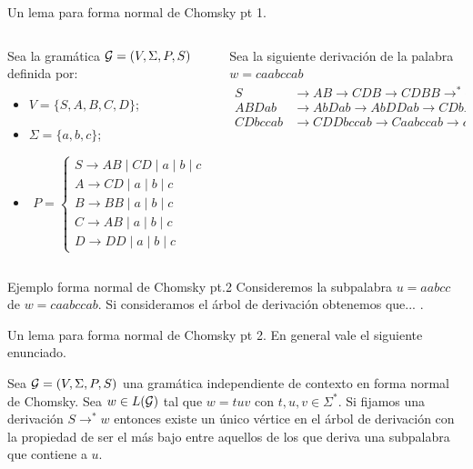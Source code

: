 \documentclass[aspectratio=169, 11pt]{beamer}
\begin{document}
	\begin{frame}[fragile]{Un lema para forma normal de Chomsky pt 1.}
		
		\begin{columns}
			
			\begin{column}{0.5\textwidth}
				Sea la gramática ${\cal G} = (V, \Sigma, P, S)$ definida por:
				\begin{itemize}
					\item $V = \{ S,A,B,C,D \}$;
					\item $\Sigma = \{ a,b,c \}$;
					\item 
						\[
						P = \begin{cases}
								S \to AB \mid CD \mid a \mid b \mid c \\
								A \to CD \mid a \mid b \mid c	\\
								B \to BB \mid a \mid b \mid c	\\
								C \to AB \mid a \mid b \mid c	\\
								D \to DD \mid a \mid b \mid c
						\end{cases}	
						\]
				\end{itemize}
			\end{column}

			\begin{column}{0.5 \textwidth}
				Sea la siguiente derivación de la palabra $w = caabccab$
				\begin{align*}
					S &\to AB \to CDB \to CDBB \to^{*} CDab \to \\
					ABDab & \to  AbDab   \to AbDDab  \to CDbDDab   \to\\
					CDbccab & \to CDDbccab \to Caabccab \to caabccab \\
				\end{align*}
			\end{column}
		\end{columns}
	\end{frame}

	
	\begin{frame}{Ejemplo forma normal de Chomsky pt.2}
		Consideremos la subpalabra $u  = aabcc$ de $w = caabccab$.
		Si consideramos el árbol de derivación obtenemos que... 
		. 
		
	\end{frame}

	\begin{frame}[fragile]{Un lema para forma normal de Chomsky pt 2.}
		En general vale el siguiente enunciado.

		\begin{lemma}
			Sea ${\cal G} = (V, \Sigma, P, S)$ una gramática independiente de contexto en forma normal de Chomsky.
			Sea $w \in L({\cal G})$ tal que $w = tuv$ con $t,u,v \in \Sigma^{*}$. 
			Si fijamos una derivación $S \to^{*} w$ entonces existe un único vértice en el árbol de derivación con la propiedad de ser el más bajo entre aquellos de los que deriva una subpalabra que contiene a $u$.
		\end{lemma}

	\end{frame}
	
\end{document}
